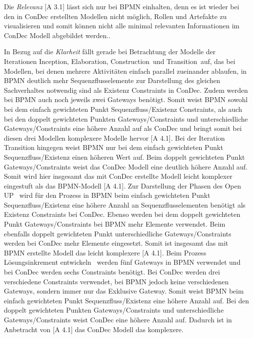 Die \textit{Relevanz} [A 3.1] lässt sich nur bei BPMN einhalten, denn es ist wieder bei den in ConDec erstellten Modellen nicht möglich, Rollen und Artefakte zu visualisieren und somit können nicht alle minimal relevanten Informationen im ConDec Modell abgebildet werden..\newline

In Bezug auf die \textit{Klarheit} fällt gerade bei Betrachtung der Modelle der Iterationen \grqq Inception\grqq, \grqq Elaboration\grqq, \grqq Construction\grqq \ und \grqq Transition\grqq \ auf, das bei Modellen, bei denen mehrere Aktivitäten einfach parallel zueinander ablaufen, in BPMN deutlich mehr Sequenzflusselemente zur Darstellung des gleichen Sachverhaltes notwendig sind als Existenz Constraints in ConDec. Zudem werden bei BPMN auch noch jeweils zwei Gateways benötigt. Somit weist BPMN sowohl bei dem einfach gewichteten Punkt Sequenzfluss/Existenz Constraints, als auch bei den doppelt gewichteten Punkten Gateways/Constraints und unterschiedliche Gateways/Constraints eine höhere Anzahl auf als ConDec und bringt somit bei diesen drei Modellen komplexere Modelle hervor [A 4.1]. \newline
Bei der Iteration Transition hingegen weist BPMN nur bei dem einfach gewichteten Punkt Sequenzfluss/Existenz einen höheren Wert auf. Beim doppelt gewichteten Punkt Gateways/Constraints weist das ConDec Modell eine deutlich höhere Anzahl auf. Somit wird hier insgesamt das mit ConDec erstellte Modell leicht komplexer eingestuft als das BPMN-Modell [A 4.1].\newline
Zur Darstellung der  \grqq Phasen des Open UP \grqq \ wird für den Prozess in BPMN beim einfach gewichteten Punkt Sequenzfluss/Existenz eine höhere Anzahl an Sequenzflusselementen benötigt als Existenz Constraints bei ConDec. Ebenso werden bei dem doppelt gewichteten Punkt Gateways/Constraints bei BPMN mehr Elemente verwendet. Beim ebenfalls doppelt gewichteten Punkt unterschiedliche Gateways/Constraints werden bei ConDec mehr Elemente eingesetzt. Somit ist insgesamt das mit BPMN erstellte Modell das leicht komplexere [A 4.1].  \newline
Beim Prozess \grqq Lösungsinkrement entwickeln \grqq \ werden fünf Gateways in BPMN verwendet und bei ConDec werden sechs Constraints benötigt. Bei ConDec werden drei verschiedene Constraints verwendet, bei BPMN jedoch keine verschiedenen Gateways, sondern immer nur das Exklusive Gateway. Somit weist BPMN beim einfach gewichteten Punkt Sequenzfluss/Existenz eine höhere Anzahl auf. Bei den doppelt gewichteten Punkten Gateways/Constraints und unterschiedliche Gateways/Constraints weist ConDec eine höhere Anzahl auf. Dadurch ist in Anbetracht von [A 4.1] das ConDec Modell das komplexere.\newline
